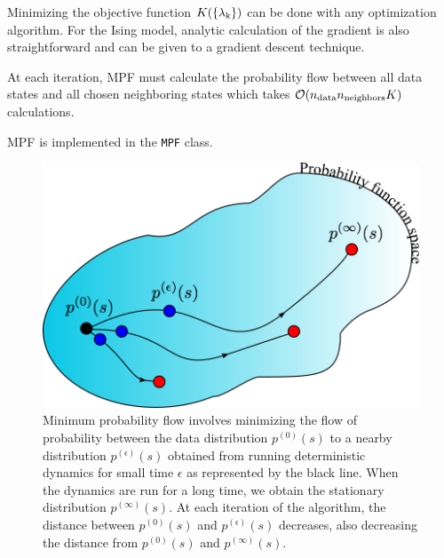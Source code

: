 \documentclass[aps,prl,twocolumn]{revtex4-1}
\begin{document}

Minimizing the objective function $K(\{\lambda_{\rm k}\})$ can be done with any optimization algorithm. For the Ising model, analytic calculation of the gradient is also straightforward and can be given to a gradient descent technique.


At each iteration, MPF must calculate the probability flow between all data states and all chosen neighboring states which takes $\mathcal{O}(n_{\rm data}n_{\rm neighbors}K)$ calculations.

MPF is implemented in the {\tt MPF} class.

\begin{figure}[htbp]\centering
	\includegraphics[width=\linewidth]{images/mpf}
\caption{Minimum probability flow involves minimizing the flow of probability between the data distribution $p^{(0)}(s)$ to a nearby distribution $p^{(\epsilon)}(s)$ obtained from running deterministic dynamics for  small time $\epsilon$ as represented by the black line. When the dynamics are run for a long time, we obtain the stationary distribution $p^{(\infty)}(s)$. At each iteration of the algorithm, the distance between $p^{(0)}(s)$ and $p^{(\epsilon)}(s)$ decreases, also decreasing the distance from $p^{(0)}(s)$ and $p^{(\infty)}(s)$.}
\label{gr:mpf}
\end{figure}
\end{document}
